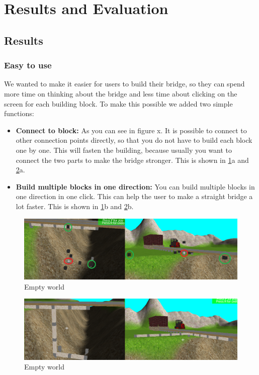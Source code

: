 \section{Results and Evaluation}
\subsection{Results}
\subsubsection{Easy to use}
We wanted to make it easier for users  to build their bridge, so they can spend more time on thinking about the bridge and less time about clicking on the screen for each building block.  To make this possible we added two simple functions:\\
\begin{itemize}
\item \textbf{Connect to block:}
As you can see in figure x. It is possible to connect to other connection points directly, so that you do not have to build each block one by one. This will fasten the building, because usually you want to connect the two parts to make the bridge stronger. This is shown in \ref{fig:easyu1}a and \ref{fig:easyu2}a.
\item \textbf{Build multiple blocks in one direction:}
You can build multiple blocks in one direction in one click. This can help the user to make a straight bridge a lot faster. This is shown in \ref{fig:easyu1}b and \ref{fig:easyu2}b.
\end{itemize}
\begin{figure}[H]
    \centering
    \includegraphics[width=1.0\textwidth]{screenshots/easyuse1.png}
    \caption{Empty world}
    \label{fig:easyu1}
\end{figure}
\begin{figure}[H]
    \centering
    \includegraphics[width=1.0\textwidth]{screenshots/easyuse2.png}
    \caption{Empty world}
    \label{fig:easyu2}
\end{figure}
